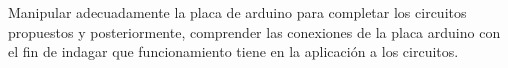 Manipular adecuadamente la placa de arduino para completar los circuitos propuestos y posteriormente, comprender las conexiones de la placa arduino con el fin de indagar que funcionamiento tiene en la aplicación a los circuitos.